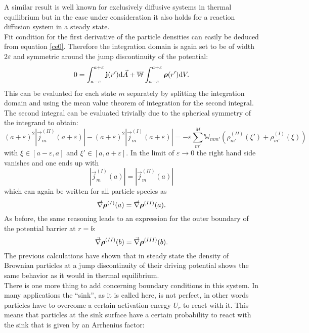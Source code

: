 A similar result is well known for exclusively diffusive systems in thermal equilibrium but in the case under consideration it also holds for a reaction diffusion system in a steady state. \\
Fit condition for the first derivative of the particle densities can easily be deduced from equation \eqref{ce0}. Therefore the integration domain is again set to be of width $2 \varepsilon$ and symmetric around the jump discontinuity of the potential:
\begin{equation}
    0 = \int_{a-\varepsilon}^{a+\varepsilon} \boldsymbol{\mathbf{j}}(r') {\rm d} \vec{A} + \mathbb{W} \int_{a-\varepsilon}^{a+\varepsilon} \boldsymbol{\mathbf{\rho}}(r') {\rm d} V.
    \label{ce9}
\end{equation}
This can be evaluated for each state $m$ separately by splitting the integration domain and using the mean value theorem of integration for the second integral. The second integral can be evaluated trivially due to the spherical symmetry of the integrand to obtain:
\begin{equation}
    (a+\varepsilon)^2 |\vec{j}^{(II)}_m(a+\varepsilon)| - (a+\varepsilon)^2 |\vec{j}^{(I)}_m(a+\varepsilon)| = - \varepsilon \sum_{m'}^{M} \mathbb{W}_{mm'} \left( \rho^{(II)}_{m'}(\xi') + \rho^{(I)}_{m'}(\xi) \right)
    \label{ce10}
\end{equation}
with $\xi \in [a-\varepsilon,a]$ and $\xi' \in [a,a+\varepsilon]$. In the limit of $\varepsilon \rightarrow 0$ the right hand side vanishes and one ends up with 
\begin{equation}
    |\vec{j}^{(I)}_m(a)| =  |\vec{j}^{(II)}_m(a)|
    \label{ce11}
\end{equation}
which can again be written for all particle species as
\begin{equation}
    \vec{\nabla}\boldsymbol{\mathbf{\rho}}^{(I)}(a) = \vec{\nabla}\boldsymbol{\mathbf{\rho}}^{(II)}(a).
    \label{ddens_fit}
\end{equation}
As before, the same reasoning leads to an expression for the outer boundary of the potential barrier at $r=b$:
\begin{equation}
    \vec{\nabla}\boldsymbol{\mathbf{\rho}}^{(II)}(b) = \vec{\nabla}\boldsymbol{\mathbf{\rho}}^{(III)}(b).
    \label{ddens_fit_b}
\end{equation}
The previous calculations have shown that in steady state the density of Brownian particles at a jump discontinuity of their driving potential shows the same behavior as it would in thermal equilibrium. \\
There is one more thing to add concerning boundary conditions in this system. In many applications the ``sink'', as it is called here, is not perfect, in other words particles have to overcome a certain activation energy $U_r$ to react with it. This means that particles at the sink surface have a certain probability to react with the sink that is given by an Arrhenius factor:
